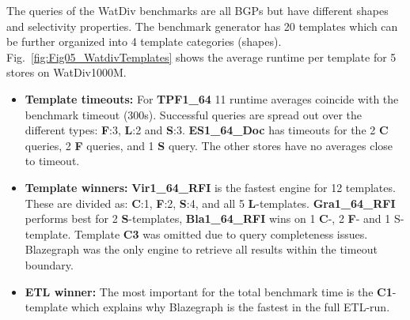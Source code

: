 The queries of the WatDiv benchmarks are all BGPs but have different shapes and selectivity properties. The benchmark generator has 20 templates which can be further organized into 4 template categories (shapes). 
Fig.~\ref{fig:Fig05_WatdivTemplates} shows the average runtime per template for 5 stores on WatDiv1000M.
\begin{itemize}
	\item \textbf{Template timeouts:} For \textbf{TPF1\_64} 11 runtime averages coincide with the benchmark timeout (300s). Successful queries are spread out over the different types: \textbf{F}:3, \textbf{L}:2 and \textbf{S}:3.
	\textbf{ES1\_64\_Doc} has timeouts for the 2 \textbf{C} queries,  2 \textbf{F} queries, and 1 \textbf{S} query. The other stores have no averages close to timeout.
	\item  \textbf{Template winners:} \textbf{Vir1\_64\_RFI} is the fastest engine for 12 templates. These are divided as: \textbf{C}:1, \textbf{F}:2, \textbf{S}:4, and all 5 \textbf{L}-templates.
	\textbf{Gra1\_64\_RFI} performs best for 2 \textbf{S}-templates, \textbf{Bla1\_64\_RFI} wins on 1 \textbf{C}-,  2 \textbf{F}-  and 1 S-template.
	Template \textbf{C3} was omitted due to query completeness issues. Blazegraph was the only engine to retrieve all results within the timeout boundary.
	\item \textbf{ETL winner:} The most important for the total benchmark time is the \textbf{C1}-template which explains why Blazegraph is the fastest in the full ETL-run.
\end{itemize}

